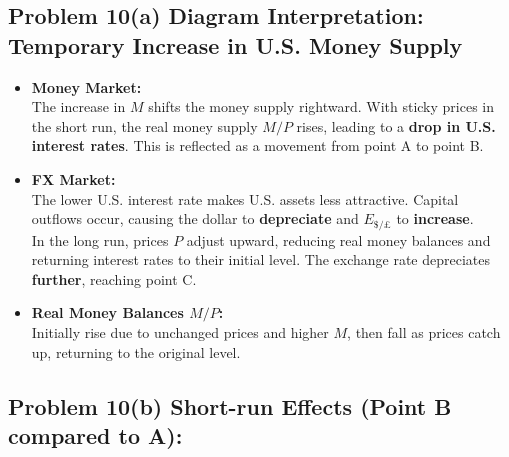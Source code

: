 \documentclass[
]{article}
\begin{document}
\subsection{Problem 10(a) Diagram Interpretation: Temporary Increase in
U.S. Money
Supply}\label{problem-10a-diagram-interpretation-temporary-increase-in-u.s.-money-supply}

\begin{itemize}
\item
  \textbf{Money Market:}\\
  The increase in \(M\) shifts the money supply rightward. With sticky
  prices in the short run, the real money supply \(M/P\) rises, leading
  to a \textbf{drop in U.S. interest rates}. This is reflected as a
  movement from point A to point B.
\item
  \textbf{FX Market:}\\
  The lower U.S. interest rate makes U.S. assets less attractive.
  Capital outflows occur, causing the dollar to \textbf{depreciate} and
  \(E_{\$/£}\) to \textbf{increase}.\\
  In the long run, prices \(P\) adjust upward, reducing real money
  balances and returning interest rates to their initial level. The
  exchange rate depreciates \textbf{further}, reaching point C.
\item
  \textbf{Real Money Balances \(M/P\):}\\
  Initially rise due to unchanged prices and higher \(M\), then fall as
  prices catch up, returning to the original level.
\end{itemize}

\subsection{Problem 10(b) Short-run Effects (Point B compared to
A):}\label{problem-10b-short-run-effects-point-b-compared-to-a}
\end{document}
